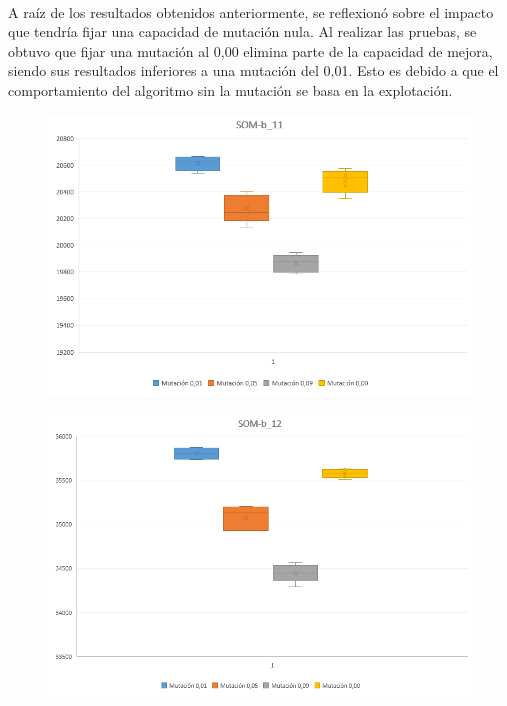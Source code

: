 	\paragraph{}A raíz de los resultados obtenidos anteriormente, se reflexionó sobre el impacto que tendría fijar una capacidad de mutación nula. Al realizar las pruebas, se obtuvo que fijar una mutación al 0,00 elimina parte de la capacidad de mejora, siendo sus resultados inferiores a una mutación del 0,01. Esto es debido a que el comportamiento del algoritmo sin la mutación se basa en la explotación.
	
	\begin{figure}[H]
		
		\centering
		\includegraphics[scale=0.65]{img/BigotesMutacion0_SOM_1}
	\end{figure}
	\begin{figure}[H]
		
		\centering
		\includegraphics[scale=0.65]{img/BigotesMutacion0_SOM_2}
		
	\end{figure}
